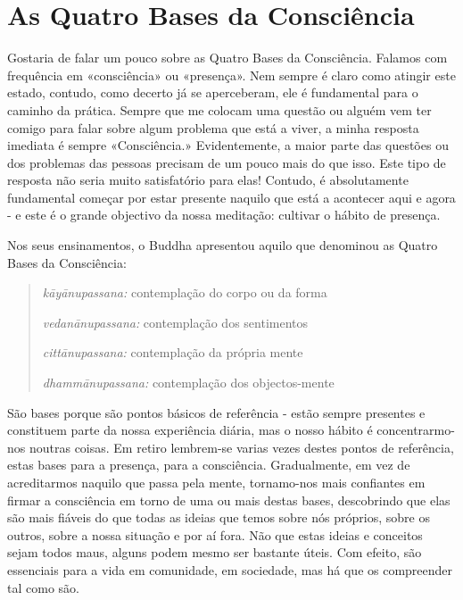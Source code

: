 \chapter{As Quatro Bases da Consciência}

Gostaria de falar um pouco sobre as Quatro Bases da Consciência. Falamos
com frequência em «consciência» ou «presença». Nem sempre é claro como
atingir este estado, contudo, como decerto já se aperceberam, ele é
fundamental para o caminho da prática. Sempre que me colocam uma questão
ou alguém vem ter comigo para falar sobre algum problema que está a
viver, a minha resposta imediata é sempre «Consciência.» Evidentemente,
a maior parte das questões ou dos problemas das pessoas precisam de um
pouco mais do que isso. Este tipo de resposta não seria muito
satisfatório para elas! Contudo, é absolutamente fundamental começar por
estar presente naquilo que está a acontecer aqui e agora - e este é o
grande objectivo da nossa meditação: cultivar o hábito de presença.

Nos seus ensinamentos, o Buddha apresentou aquilo que denominou as
Quatro Bases da Consciência:

\begin{quote}
  \emph{kāyānupassana:} contemplação do corpo ou da forma

  \emph{vedanānupassana:} contemplação dos sentimentos

  \emph{cittānupassana:} contemplação da própria mente

  \emph{dhammānupassana:} contemplação dos objectos-mente
\end{quote}

São bases porque são pontos básicos de referência - estão sempre
presentes e constituem parte da nossa experiência diária, mas o nosso
hábito é concentrarmo-nos noutras coisas. Em retiro lembrem-se varias
vezes destes pontos de referência, estas bases para a presença, para a
consciência. Gradualmente, em vez de acreditarmos naquilo que passa pela
mente, tornamo-nos mais confiantes em firmar a consciência em torno de
uma ou mais destas bases, descobrindo que elas são mais fiáveis do que
todas as ideias que temos sobre nós próprios, sobre os outros, sobre a
nossa situação e por aí fora. Não que estas ideias e conceitos sejam
todos maus, alguns podem mesmo ser bastante úteis. Com efeito, são
essenciais para a vida em comunidade, em sociedade, mas há que os
compreender tal como são.


